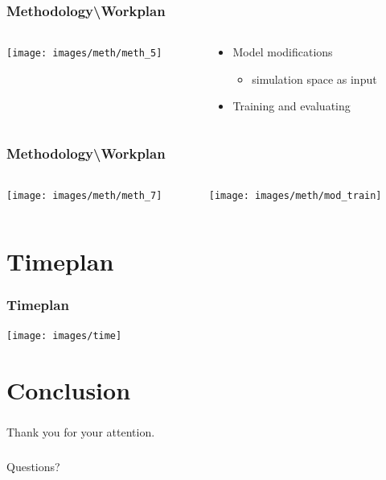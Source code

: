 \documentclass[18pt]{beamer}
\begin{document}
\begin{frame}[t]
  \frametitle{Methodology\textbackslash Workplan}
  \begin{columns}[t]
    \begin{column}{0.35\textwidth}
      \texttt{[image: images/meth/meth\_5]}
    \end{column}
    \begin{column}[t]{0.65\textwidth}
      \vspace*{-7cm}
      \begin{itemize}
      \item Model modifications
        \begin{itemize}
        \item simulation space as input
        \end{itemize}
      \item Training and evaluating
      \end{itemize}
    \end{column}
  \end{columns}
\end{frame}


\begin{frame}
  \frametitle{Methodology\textbackslash Workplan}
  \begin{columns}
    \begin{column}{0.35\textwidth}
      \texttt{[image: images/meth/meth\_7]}
    \end{column}
    \begin{column}[c]{0.65\textwidth}
      \texttt{[image: images/meth/mod\_train]}
    \end{column}
  \end{columns}
\end{frame}


\section{Timeplan}
\begin{frame}[t]
  \frametitle{Timeplan}
  \begin{center}
    \texttt{[image: images/time]}
  \end{center}
\end{frame}


\section{Conclusion}

\begin{frame}
  \frametitle{}
  \begin{center}
    \huge{Thank you for your attention.}
  \end{center}
\end{frame}

\begin{frame}
  \frametitle{}
  \begin{center}
    \huge{Questions?}
  \end{center}
\end{frame}
\end{document}
